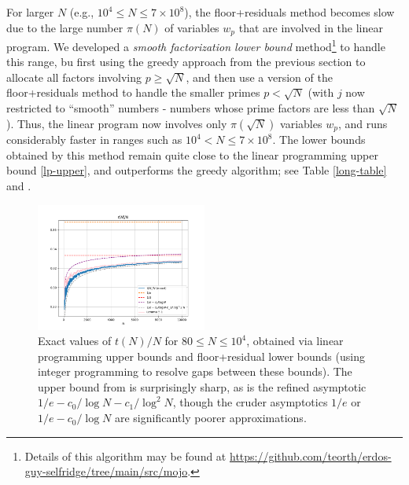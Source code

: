 \documentclass[12pt,a4paper,reqno]{amsart}
\numberwithin{equation}{section}
\theoremstyle{plain}
\theoremstyle{definition}
\begin{document}
For larger $N$ (e.g., $10^4 \leq N \leq 7 \times 10^8$), the floor+residuals method becomes slow due to the large number $\pi(N)$ of variables $w_p$ that are involved in the linear program.  We developed a \emph{smooth factorization lower bound} method\footnote{Details of this algorithm may be found at \url{https://github.com/teorth/erdos-guy-selfridge/tree/main/src/mojo}.} to handle this range, bu first using the greedy approach from the previous section to allocate all factors involving $p \geq \sqrt{N}$, and then use a version of the floor+residuals method to handle the smaller primes $p < \sqrt{N}$ (with $j$ now restricted to ``smooth'' numbers - numbers whose prime factors are less than $\sqrt{N}$).  Thus, the linear program now involves only $\pi(\sqrt{N})$ variables $w_p$, and runs considerably faster in ranges such as $10^4 < N \leq 7 \times 10^8$.  The lower bounds obtained by this method remain quite close to the linear programming upper bound \eqref{lp-upper}, and outperforms the greedy algorithm; see Table \ref{long-table} and .  


\begin{figure}
  \centering
  \includegraphics[width=0.5\textwidth]{longplot.png}
  \caption{Exact values of $t(N)/N$ for $80 \leq N \leq 10^4$, obtained via linear programming upper bounds and floor+residual lower bounds (using integer programming to resolve gaps between these bounds).  The upper bound from  is surprisingly sharp, as is the refined asymptotic $1/e - c_0/\log N - c_1/\log^2 N$, though the cruder asymptotics $1/e$ or $1/e - c_0/\log N$ are significantly poorer approximations.}
  \label{fig-long}
  \end{figure}
\end{document}
